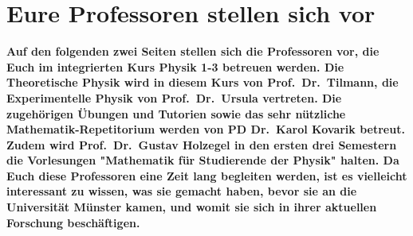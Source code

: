 \section[Eure Profs stellen sich vor]{Eure Professoren stellen sich vor}
\textbf{Auf den folgenden zwei Seiten stellen sich die Professoren vor, die Euch im integrierten Kurs Physik 1-3 betreuen werden. 
Die Theoretische Physik wird in diesem Kurs von Prof.\ Dr.\ Tilmann, die Experimentelle Physik von Prof.\ Dr.\ Ursula vertreten. 
Die zugehörigen Übungen und Tutorien sowie das sehr nützliche Mathematik-Repetitorium werden von PD Dr.\ Karol Kovarik betreut. 
Zudem wird Prof.\ Dr.\ Gustav Holzegel in den ersten drei Semestern die Vorlesungen "Mathematik für Studierende der Physik" halten. Da Euch diese Professoren eine Zeit lang begleiten werden, ist es vielleicht interessant zu wissen, was sie gemacht haben, bevor sie an die Universität Münster kamen, und womit sie sich in ihrer aktuellen Forschung beschäftigen.}

